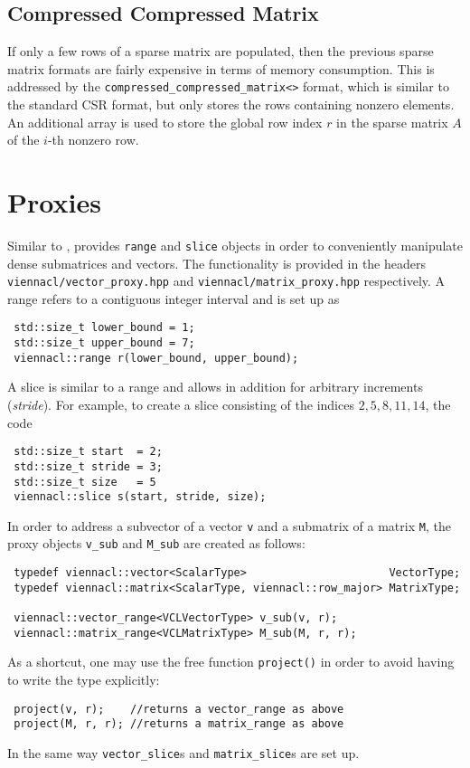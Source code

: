 \subsection{Compressed Compressed Matrix}
If only a few rows of a sparse matrix are populated, then the previous sparse matrix formats are fairly expensive in terms of memory consumption.
This is addressed by the \lstinline|compressed_compressed_matrix<>| format, which is similar to the standard CSR format, but only stores the rows containing nonzero elements.
An additional array is used to store the global row index $r$ in the sparse matrix $A$ of the $i$-th nonzero row.



\section{Proxies}
Similar to {\ublas}, {\ViennaCL} provides \lstinline|range| and \lstinline|slice| objects in order to conveniently manipulate dense submatrices and vectors. The functionality is
provided in the headers \lstinline|viennacl/vector_proxy.hpp| and \lstinline|viennacl/matrix_proxy.hpp| respectively.
A range refers to a contiguous integer interval and is set up as
\begin{lstlisting}
 std::size_t lower_bound = 1;
 std::size_t upper_bound = 7;
 viennacl::range r(lower_bound, upper_bound);
\end{lstlisting}
A slice is similar to a range and allows in addition for arbitrary increments (\emph{stride}).
For example, to create a slice consisting of the indices $2, 5, 8, 11, 14$, the code
\begin{lstlisting}
 std::size_t start  = 2;
 std::size_t stride = 3;
 std::size_t size   = 5
 viennacl::slice s(start, stride, size);
\end{lstlisting}

In order to address a subvector of a vector \lstinline|v| and a submatrix of a matrix \lstinline|M|, the proxy objects \lstinline|v_sub| and \lstinline|M_sub|
are created as follows:
\begin{lstlisting}
 typedef viennacl::vector<ScalarType>                      VectorType;
 typedef viennacl::matrix<ScalarType, viennacl::row_major> MatrixType;

 viennacl::vector_range<VCLVectorType> v_sub(v, r);
 viennacl::matrix_range<VCLMatrixType> M_sub(M, r, r);
\end{lstlisting}
As a shortcut, one may use the free function \lstinline|project()| in order to avoid having to write the type explicitly:
\begin{lstlisting}
 project(v, r);    //returns a vector_range as above
 project(M, r, r); //returns a matrix_range as above
\end{lstlisting}
In the same way \lstinline|vector_slice|s and \lstinline|matrix_slice|s are set up.

